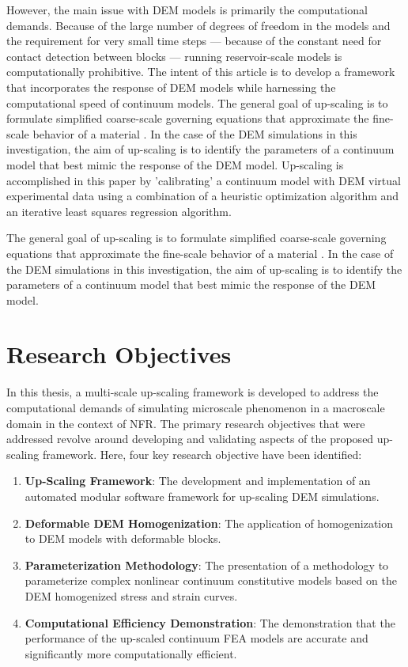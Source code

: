 However, the main issue with DEM models is primarily the computational demands. Because of the large number of degrees of freedom in the models and the requirement for very small time steps --- because of the constant need for contact detection between blocks --- running reservoir-scale models is computationally prohibitive. The intent of this article is to develop a framework that incorporates the response of DEM models while harnessing the computational speed of continuum models. The general goal of up-scaling is to formulate simplified coarse-scale governing equations that approximate the fine-scale behavior of a material \citep{Geers_2010}. In the case of the DEM simulations in this investigation, the aim of up-scaling is to identify the parameters of a continuum model that best mimic the response of the DEM model.  Up-scaling is accomplished in this paper by 'calibrating' a continuum model with DEM virtual experimental data using a combination of a heuristic optimization algorithm and an iterative least squares regression algorithm.

The general goal of up-scaling is to formulate simplified coarse-scale governing equations that approximate the fine-scale behavior of a material \citep{Geers_2010}. In the case of the DEM simulations in this investigation, the aim of up-scaling is to identify the parameters of a continuum model that best mimic the response of the DEM model.

\section{Research Objectives}

In this thesis, a multi-scale up-scaling framework is developed to address the computational demands of simulating microscale phenomenon in a macroscale domain in the context of NFR. The primary research objectives that were addressed revolve around developing and validating aspects of the proposed up-scaling framework. Here, four key research objective have been identified:

\begin{enumerate}
\item \textbf{Up-Scaling Framework}: The development and implementation of an automated modular software framework for up-scaling DEM simulations.
\item \textbf{Deformable DEM Homogenization}: The application of homogenization to DEM models with deformable blocks.
\item \textbf{Parameterization Methodology}: The presentation of a methodology to parameterize complex nonlinear continuum constitutive models based on the DEM homogenized stress and strain curves.
\item \textbf{Computational Efficiency Demonstration}: The demonstration that the performance of the up-scaled continuum FEA models are accurate and significantly more computationally efficient.
\end{enumerate}

